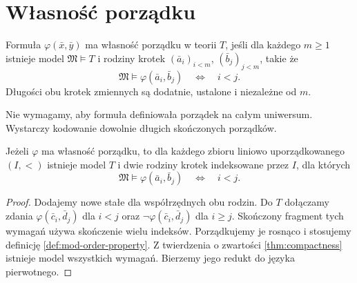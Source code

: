 \section{Własność porządku}

\begin{definicja}
\label{def:mod-order-property}
Formuła $\varphi(\bar x,\bar y)$ ma własność
porządku w teorii $T$, jeśli dla każdego $m\geq1$
istnieje model $\mathfrak M\models T$ i rodziny
krotek $(\bar a_i)_{i<m}$, $(\bar b_j)_{j<m}$,
takie że
\[
\mathfrak M\models\varphi(\bar a_i,\bar b_j)
\quad\Longleftrightarrow\quad i<j.
\]
Długości obu krotek zmiennych są dodatnie,
ustalone i niezależne od $m$.
\end{definicja}

Nie wymagamy, aby formuła definiowała porządek
na całym uniwersum. Wystarczy kodowanie dowolnie
długich skończonych porządków.

\begin{lemat}
\label{lem:mod-op-linear-index}
Jeżeli $\varphi$ ma własność porządku, to dla
każdego zbioru liniowo uporządkowanego $(I,<)$
istnieje model $T$ i dwie rodziny krotek
indeksowane przez $I$, dla których
\[
\mathfrak M\models\varphi(\bar a_i,\bar b_j)
\quad\Longleftrightarrow\quad i<j.
\]
\end{lemat}
\begin{proof}
Dodajemy nowe stałe dla współrzędnych obu rodzin.
Do $T$ dołączamy zdania
$\varphi(\bar c_i,\bar d_j)$ dla $i<j$
oraz $\neg\varphi(\bar c_i,\bar d_j)$ dla $i\geq j$.
Skończony fragment tych wymagań używa skończenie
wielu indeksów. Porządkujemy je rosnąco i stosujemy
definicję \ref{def:mod-order-property}.
Z twierdzenia o zwartości \ref{thm:compactness}
istnieje model wszystkich wymagań.
Bierzemy jego redukt do języka pierwotnego.
\end{proof}

